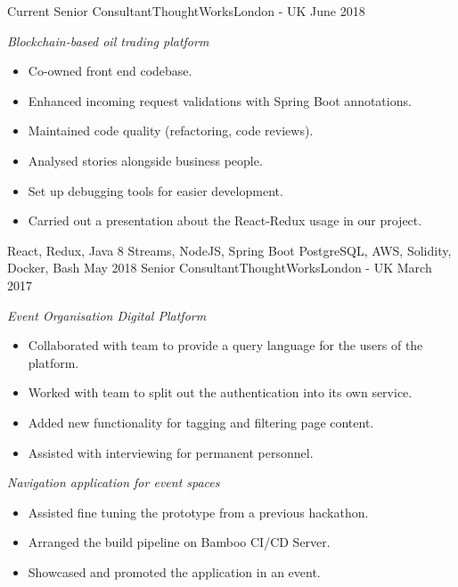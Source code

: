 %
%
%

  \begin{experiences}
    \experience
      {Current}
      {Senior Consultant}{ThoughtWorks}{London - UK}
      {June 2018}
      {
        \emph{Blockchain-based oil trading platform}
        \begin{itemize}
          \item Co-owned front end codebase.
          \item Enhanced incoming request validations with Spring Boot annotations.
          \item Maintained code quality (refactoring, code reviews).
          \item Analysed stories alongside business people.
          \item Set up debugging tools for easier development.
          \item Carried out a presentation about the React-Redux usage in our project.
        \end{itemize}
      }
      {React, Redux, Java 8 Streams, NodeJS, Spring Boot}
      {PostgreSQL, AWS, Solidity, Docker, Bash}
    \emptySeparator
    \experience
      {May 2018}
      {Senior Consultant}{ThoughtWorks}{London - UK}
      {March 2017}
      {
        \emph{Event Organisation Digital Platform}
        \begin{itemize}
          \item Collaborated with team to provide a query language for the users of the platform.
          \item Worked with team to split out the authentication into its own service.
          \item Added new functionality for tagging and filtering page content.
          \item Assisted with interviewing for permanent personnel.
        \end{itemize}

        \emph{Navigation application for event spaces}
        \begin{itemize}
          \item Assisted fine tuning the prototype from a previous hackathon.
          \item Arranged the build pipeline on Bamboo CI/CD Server.
          \item Showcased and promoted the application in an event.
        \end{itemize}

}
\end{experiences}
